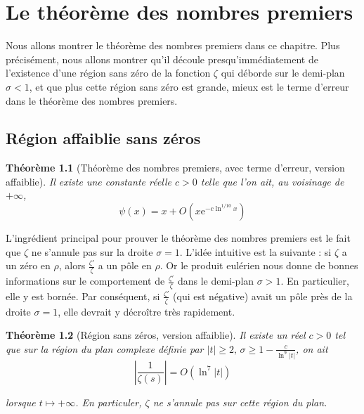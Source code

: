 \documentclass[french]{report}
\newtheorem{theorem}{Théorème}[section]
\begin{document}
\chapter{Le théorème des nombres premiers}

Nous allons montrer le théorème des nombres premiers dans ce chapitre. Plus précisément, nous allons montrer qu'il découle presqu'immédiatement de l'existence d'une région sans zéro de la fonction $\zeta$ qui déborde sur le demi-plan $\sigma<1$, et que plus cette région sans zéro est grande, mieux est le terme d'erreur dans le théorème des nombres premiers.

\section{Région affaiblie sans zéros}\label{section:region-affaiblie}

\begin{theorem}[Théorème des nombres premiers, avec terme d'erreur, version affaiblie]\label{eq:tnp-erreur-1}
  Il existe une constante réelle $c>0$ telle que l'on ait, au voisinage de $+\infty$,
  \begin{equation}
    \psi(x)=x+O(x\mathrm{e}^{-c\ln^{1/10} x})
  \end{equation}
\end{theorem}

L'ingrédient principal pour prouver le théorème des nombres premiers est le fait que $\zeta$ ne s'annule pas sur la droite $\sigma=1$. L'idée intuitive est la suivante : si $\zeta$ a un zéro en $\rho$, alors $\frac{\zeta'}{\zeta}$ a un pôle en $\rho$. Or le produit eulérien nous donne de bonnes informations sur le comportement de $\frac{\zeta'}{\zeta}$ dans le demi-plan $\sigma>1$. En particulier, elle y est bornée. Par conséquent, si $\frac{\zeta'}{\zeta}$  (qui est négative) avait un pôle près de la droite $\sigma=1$, elle devrait y décroître très rapidement.

\begin{theorem}[Région sans zéros, version affaiblie]\label{eq:region-faible-sans-zero}
  Il existe un réel $c>0$ tel que sur la région du plan complexe définie par $|t|\geq2,\,\sigma\geq1-\frac{c}{\ln^9|t|}$, on ait
  \[ \left|\frac{1}{\zeta(s)}\right| = O(\ln^7|t|) \]

  lorsque $t\mapsto+\infty$. En particuler, $\zeta$ ne s'annule pas sur cette région du plan.
\end{theorem}
\end{document}
